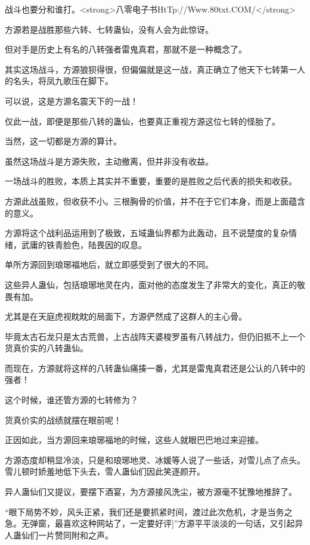 
\begin{this_body}

战斗也要分和谁打。<strong>八零电子书HtTp://Www.80txt.COM/</strong>

方源若是战胜那些六转、七转蛊仙，没有人会为此惊讶。

但对手是历史上有名的八转强者雷鬼真君，那就不是一种概念了。

其实这场战斗，方源狼狈得很，但偏偏就是这一战，真正确立了他天下七转第一人的名头，将凤九歌压在脚下。

可以说，这是方源名震天下的一战！

仅此一战，即便是那些八转的蛊仙，也要真正重视方源这位七转的怪胎了。

当然，这一切都是方源的算计。

虽然这场战斗是方源失败，主动撤离，但并非没有收益。

一场战斗的胜败，本质上其实并不重要，重要的是胜败之后代表的损失和收获。

方源此战虽败，但收获不小。三根胸骨的价值，并不在于它们本身，而是上面蕴含的意义。

方源将这个战利品运用到了极致，五域蛊仙界都为此轰动，且不说楚度的复杂情绪，武庸的铁青脸色，陆畏因的叹息。

单所方源回到琅琊福地后，就立即感受到了很大的不同。

这些异人蛊仙，包括琅琊地灵在内，面对他的态度发生了非常大的变化，真正的敬畏有加。

尤其是在天庭虎视眈眈的局面下，方源俨然成了这群人的主心骨。

毕竟太古石龙只是太古荒兽，上古战阵天婆梭罗虽有八转战力，但仍旧抵不上一个货真价实的八转蛊仙。

而现在，方源就将这样的八转蛊仙痛揍一番，尤其是雷鬼真君还是公认的八转中的强者！

这个时候，谁还管方源的七转修为？

货真价实的战绩就摆在眼前呢！

正因如此，当方源回来琅琊福地的时候，这些人就眼巴巴地过来迎接。

方源态度却稍显冷淡，只是和琅琊地灵、冰媛等人说了一些话，对雪儿点了点头。雪儿顿时娇羞地低下头去，雪人蛊仙们因此笑逐颜开。

异人蛊仙们又提议，要摆下酒宴，为方源接风洗尘，被方源毫不犹豫地推辞了。

“眼下局势不妙，风头正紧，我们还是要抓紧时间，渡过此次危机，才是当务之急。无弹窗，最喜欢这种网站了，一定要好评]”方源平平淡淡的一句话，又引起异人蛊仙们一片赞同附和之声。


\end{this_body}
